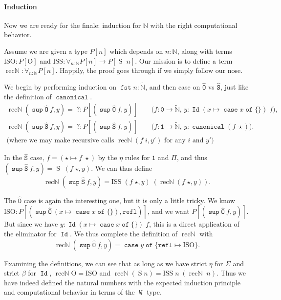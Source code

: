 \documentclass[a4paper,UKenglish,cleveref,nameinlink,autoref,thm-restate]{lipics-v2019}
\newcommand{\zero}{\mathtt{0}}
\newcommand{\one}{\mathtt{1}}
\newcommand{\codeO}{\mathtt{\hat{O}}}
\newcommand{\codeS}{\mathtt{\hat{S}}}
\DeclareMathOperator{\supop}{\mathtt{sup}}
\renewcommand{\sup}[2]{\supop {#1}\:\!{#2}}
\newcommand{\N}{\hyperref[define-N]{\mathbb{N}}}
\newcommand{\preN}{\hyperref[define-preN]{\tilde{\mathbb{N}}}}
\DeclareMathOperator{\case}{\mathtt{case}}
\newcommand{\caset}[2]{\case {#1}\;\mathtt{of}\;\{{#2}\}}
\DeclareMathOperator{\W}{\mathtt{W}}
\DeclareMathOperator{\Idop}{\mathtt{Id}}
\newcommand{\Id}[2]{\Idop {#1}\;{#2}}
\newcommand{\refl}{\mathtt{refl}}
\DeclareMathOperator{\fst}{\mathtt{fst}}
\DeclareMathOperator{\canonical}{\hyperref[define-canonical]{\mathtt{canonical}}}
\newcommand{\ISO}{\mathrm{ISO}}
\newcommand{\ISS}{\mathrm{ISS}}
\newcommand{\zerO}{\hyperref[define-O]{\mathrm{O}}}
\DeclareMathOperator{\Succ}{\hyperref[define-S]{S}}
\DeclareMathOperator{\recN}{\mathrm{rec\mathbb{N}}}
\begin{document}
\paragraph*{Induction}

Now we are ready for the finale: induction for $\N$ with the right computational behavior.

Assume we are given a type $P[n]$ which depends on $n : \N$, along with terms $\ISO : P[\zerO]$ and $\ISS : \forall_{n : \N}P[n] \to P[\Succ\;n]$. Our mission is to define a term $\recN : \forall_{n : \N}P[n]$. Happily, the proof goes through if we simply follow our nose.

We begin by performing induction on $\fst n : \preN$, and then case on $\codeO$ vs $\codeS$, just like the definition of $\canonical$.
\begin{gather*}
\recN (\sup{\codeO}{f},y) =\; ? : P[(\sup{\codeO}{f},y)]\qquad\text{($f : \zero \to \preN$, $y : \Id{(x\mapsto\caset{x}{})}{f}$)},\\
\recN (\sup{\codeS}{f},y) =\; ? : P[(\sup{\codeS}{f},y)]\qquad\text{($f : \one \to \preN$, $y : \canonical(f\;\star)$)}.\\
\text{(where we may make recursive calls $\recN(f\; i, y')$ for any $i$ and $y'$)}
\end{gather*}

In the $\codeS$ case, $f = (\star \mapsto f\; \star)$ by the $\eta$ rules for $\one$ and $\Pi$, and thus $(\sup{\codeS}{f}, y) = \Succ\;(f\; \star, y)$. We can thus define
\begin{equation*}\recN (\sup{\codeS}{f},y) = \ISS\;(f\;\star, y)\;(\recN(f\;\star, y)).\end{equation*}

The $\codeO$ case is again the interesting one, but it is only a little tricky. We know $\ISO : P[ (\sup{\codeO}{(x\mapsto\caset{x}{})},\refl)]$, and we want $P[(\sup{\codeO}{f},y)]$. But since we have $y : \Id{(x\mapsto\caset{x}{})}{f}$, this is a direct application of the eliminator for $\Idop$.
We thus complete the definition of $\recN$ with
\begin{equation*}\recN (\sup{\codeO}{f},y) = \caset{y}{\refl \mapsto \ISO}.\end{equation*}

Examining the definitions, we can see that as long as we have strict $\eta$ for $\Sigma$ and strict $\beta$ for $\Idop$, $\recN \zerO = \ISO$ and $\recN(\Succ n) = \ISS\;n\;(\recN\;n)$. Thus we have indeed defined the natural numbers with the expected induction principle and computational behavior in terms of the $\W$ type.
\end{document}
